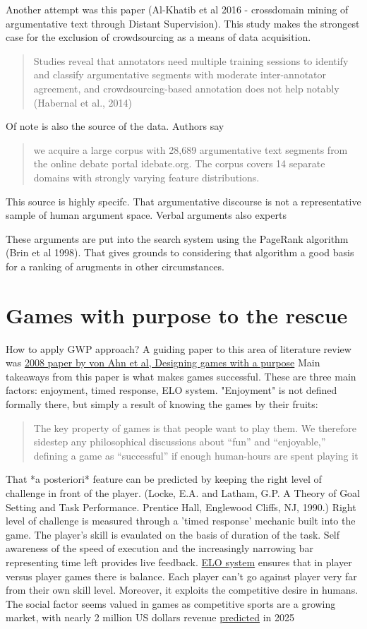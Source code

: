 \documentclass{article}
\begin{document}
Another attempt was this paper (Al-Khatib et al 2016 - crossdomain mining of argumentative text through Distant Supervision).
This study makes the strongest case for the exclusion of crowdsourcing as a means of data acquisition.
\begin{quote}
 Studies reveal that annotators need multiple training sessions to identify and classify argumentative segments with moderate inter-annotator agreement, and crowdsourcing-based annotation does not help notably (Habernal et al., 2014)
\end{quote}
Of note is also the source of the data. Authors say
\begin{quote}
 we acquire a large corpus with 28,689 argumentative text segments from the online debate portal idebate.org. The corpus covers 14 separate domains with strongly varying feature distributions.
\end{quote}
This source is highly specifc. That argumentative discourse is not a representative sample of human argument space. Verbal arguments
also experts 

These arguments are put into the search system using the PageRank algorithm (Brin et al 1998).  That gives grounds to considering that algorithm a good basis for a ranking of arugments in other circumstances.

\section{Games with purpose to the rescue}
How to apply GWP approach?
A guiding paper to this area of literature review was \href{https://dl.acm.org/doi/10.1145/1378704.1378719}{2008 paper by von Ahn et al, Designing games with a purpose} 
Main takeaways from this paper is what makes games successful.
These are three main factors: enjoyment, timed response, ELO system.
"Enjoyment" is not defined formally there, but simply a result of knowing the games by their fruits:
\begin{quote}
 The key property of games is that people want to play them. We therefore sidestep any philosophical discussions about “fun” and “enjoyable,” defining a game as “successful” if enough human-hours are spent playing it
\end{quote}
That  *a posteriori* feature can be predicted by keeping the right level of challenge in front of the player. (Locke, E.A. and Latham, G.P. A Theory of Goal Setting and Task Performance. Prentice Hall, Englewood Cliffs, NJ, 1990.)
Right level of challenge is measured through a 'timed response' mechanic built into the game.
The player's skill is evaulated on the basis of duration of the task. 
Self awareness of the speed of execution and the increasingly narrowing bar representing time left provides live feedback.
\href{https://en.wikipedia.org/wiki/Elo_rating_system}{ELO system} ensures that in player versus player games there is balance. Each player can't go against player very far from their own skill level.
Moreover, it exploits the competitive desire in humans.
The social factor seems valued in games as competitive sports are a growing market, with nearly 2 million US dollars revenue \href{https://www.statista.com/statistics/490522/global-esports-market-revenue/}{predicted} in 2025
\end{document}
